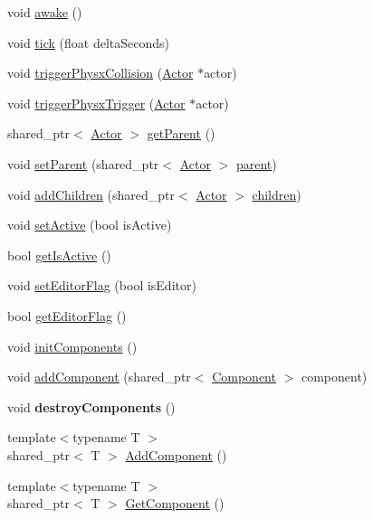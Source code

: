 \begin{DoxyCompactItemize}
\item 
void \hyperlink{class_actor_a56c0c99205523bf3c4dfd2e53180f375}{awake} ()
\item 
void \hyperlink{class_actor_a2ad907a434d65b64cc707813b4fdfa58}{tick} (float delta\+Seconds)
\item 
void \hyperlink{class_actor_afc18e8c46f392d2f8e73438a7bdef217}{trigger\+Physx\+Collision} (\hyperlink{class_actor}{Actor} $\ast$actor)
\item 
void \hyperlink{class_actor_adac69a3dfa2e0b449a28ecb064eab08f}{trigger\+Physx\+Trigger} (\hyperlink{class_actor}{Actor} $\ast$actor)
\item 
shared\+\_\+ptr$<$ \hyperlink{class_actor}{Actor} $>$ \hyperlink{class_actor_afa78edc729309614a051ac0114e8863e}{get\+Parent} ()
\item 
void \hyperlink{class_actor_a3efc64aa73b4b69dc3bc5b37154eadcc}{set\+Parent} (shared\+\_\+ptr$<$ \hyperlink{class_actor}{Actor} $>$ \hyperlink{class_actor_abb76f1796e97a76079f4d181f7fd1088}{parent})
\item 
void \hyperlink{class_actor_acb295666d6ec675b1a50ddb337954a4f}{add\+Children} (shared\+\_\+ptr$<$ \hyperlink{class_actor}{Actor} $>$ \hyperlink{class_actor_a572508685fe6f0387c5342d285c92b7f}{children})
\item 
void \hyperlink{class_actor_aec859bd1effede68867cfd6d5543249f}{set\+Active} (bool is\+Active)
\item 
bool \hyperlink{class_actor_a171bd8310af9bbaeed9ae45b74f3a1cf}{get\+Is\+Active} ()
\item 
void \hyperlink{class_actor_aeb08c0442fc1527d5e68e6f9d6cc9838}{set\+Editor\+Flag} (bool is\+Editor)
\item 
bool \hyperlink{class_actor_a89683da9b3aa1bd99ceec334c90e1a7b}{get\+Editor\+Flag} ()
\item 
void \hyperlink{class_actor_a12abcd53c7d35e55cb7eb43de049f1e5}{init\+Components} ()
\item 
void \hyperlink{class_actor_a7420eb679c14e07b90f3a777403cdad0}{add\+Component} (shared\+\_\+ptr$<$ \hyperlink{class_component}{Component} $>$ component)
\item 
\hypertarget{class_actor_a40a74338fb5a54d6ad2ee834d98d0643}{}void {\bfseries destroy\+Components} ()\label{class_actor_a40a74338fb5a54d6ad2ee834d98d0643}

\item 
{\footnotesize template$<$typename T $>$ }\\shared\+\_\+ptr$<$ T $>$ \hyperlink{class_actor_a3756af4dbe3b2ed513fe47afb081239d}{Add\+Component} ()
\item 
{\footnotesize template$<$typename T $>$ }\\shared\+\_\+ptr$<$ T $>$ \hyperlink{class_actor_ab8d69cb3d4fc68daf7120d9c207923f6}{Get\+Component} ()
\end{DoxyCompactItemize}
